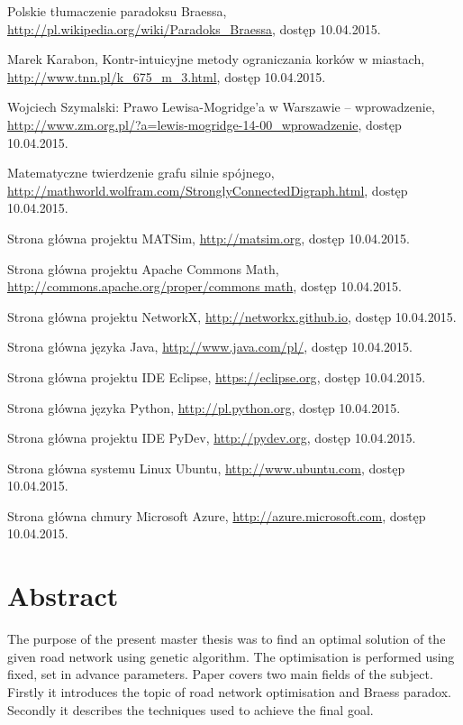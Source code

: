 \documentclass[twoside,12pt]{report}
\let\oldsection\chapter
\def\chapter{\cleardoublepage\oldsection}
\begin{document}
\begin{thebibliography}{99}
	Polskie tłumaczenie paradoksu Braessa,
	\url{http://pl.wikipedia.org/wiki/Paradoks_Braessa},
	dostęp 10.04.2015.
	
	Marek Karabon, Kontr-intuicyjne metody ograniczania korków w miastach,
	\url{http://www.tnn.pl/k_675_m_3.html},
	dostęp 10.04.2015.
	
	Wojciech Szymalski: Prawo Lewisa-Mogridge’a w Warszawie – wprowadzenie,
	\url{http://www.zm.org.pl/?a=lewis-mogridge-14-00_wprowadzenie},
	dostęp 10.04.2015.
	   
	Matematyczne twierdzenie grafu silnie spójnego,
	\url{http://mathworld.wolfram.com/StronglyConnectedDigraph.html},
	dostęp 10.04.2015.	

	Strona główna projektu MATSim,
	\url{http://matsim.org},
	dostęp 10.04.2015.

	Strona główna projektu Apache Commons Math,
	\url{http://commons.apache.org/proper/commons math},
	dostęp 10.04.2015.
	
	Strona główna projektu NetworkX,
	\url{http://networkx.github.io},
	dostęp 10.04.2015.

	Strona główna języka Java,
	\url{http://www.java.com/pl/},
	dostęp 10.04.2015.

	Strona główna projektu IDE Eclipse, 
	\url{https://eclipse.org},
	dostęp 10.04.2015.
				
	Strona główna języka Python,
	\url{http://pl.python.org},
	dostęp 10.04.2015.
	
	Strona główna projektu IDE PyDev,
	\url{http://pydev.org},
	dostęp 10.04.2015.
	
	Strona główna systemu Linux Ubuntu,
	\url{http://www.ubuntu.com},
	dostęp 10.04.2015.
	
	Strona główna chmury Microsoft Azure,
	\url{http://azure.microsoft.com},
	dostęp 10.04.2015.
			


\end{thebibliography}

\clearpage
{}
{}
\chapter*{Abstract}

The purpose of the present master thesis was to find an optimal solution of the given road network using genetic algorithm. The optimisation is performed using fixed, set in advance parameters. Paper covers two main fields of the subject. Firstly it introduces the topic of road network optimisation and Braess paradox. Secondly it describes the techniques used to achieve the final goal.
\end{document}
